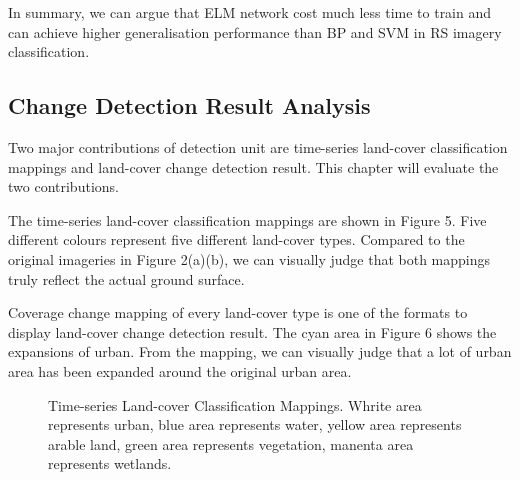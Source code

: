 \documentclass{elsart}
\begin{document}
In summary, we can argue that ELM network cost much less time to train and can achieve higher generalisation performance than BP and SVM in RS imagery classification.

\subsection{Change Detection Result Analysis}
Two major contributions of detection unit are time-series land-cover classification mappings and land-cover change detection result.
This chapter will evaluate the two contributions.
\par
The time-series land-cover classification mappings are shown in Figure 5. 
Five different colours represent five different land-cover types.
Compared to the original imageries in Figure 2(a)(b), we can visually judge that both mappings truly reflect the actual ground surface.
\par

Coverage change mapping of every land-cover type is one of the formats to display land-cover change detection result.
The cyan area in Figure 6 shows the expansions of urban.
From the mapping, we can visually judge that a lot of urban area has been expanded around the original urban area.
\par

\begin{figure}[H]
\centering
{}
\caption{Time-series Land-cover Classification Mappings. Whrite area represents urban, blue area represents water, yellow area represents arable land, green area represents vegetation, manenta area represents wetlands.}
\label{Fig.lable}
\end{figure}
\end{document}
